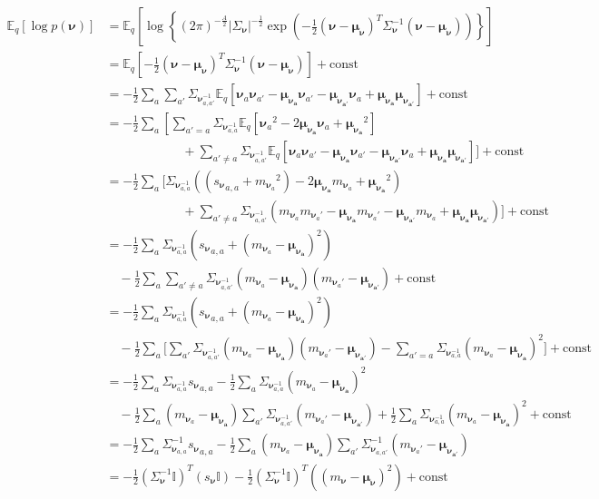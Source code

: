 \documentclass[letterpaper,12pt]{article}
\newcommand{\lc}{\left \{} %
\newcommand{\rc}{\right \}} %
\newcommand{\lp}{\left (} %
\newcommand{\rp}{\right )} %
\newcommand{\lb}{\left [} %
\newcommand{\rb}{\right ]} %
\newcommand{\mean}[1]{\ensuremath{\boldsymbol{\mu}_{#1}}} %
\newcommand{\nuv}{\boldsymbol{\nu}} %
\newcommand{\Sigmanu}{\Sigma_{\nuv}} %
\newcommand{\snu}{\ensuremath{s_\nuv}} %
\newcommand{\nua}{\ensuremath{\nuv_a}} %
\newcommand{\nuaprime}{\ensuremath{\nuv_{a'}}} %
\newcommand{\meananu}{\ensuremath{\boldsymbol{\mu_{\nuv_a}}}} %
\newcommand{\meanaprimenu}{\ensuremath{\boldsymbol{\mu_{\nuv_{a'}}}}} %
\newcommand{\mnusub}[1]{\ensuremath{m_{\nuv_#1}}} %
\newcommand{\E}{\mathbb{E}_q}
\begin{document}
\begin{equation}
\begin{split}
    \E \lb \log p(\nuv) \rb &= \E \lb \log \lc (2 \pi)^{-\frac{A}{2}}|\Sigmanu |^{-\frac{1}{2}} \exp \lp - \frac{1}{2} (\nuv - \mean{\nuv})^T \Sigmanu^{-1} (\nuv - \mean{\nuv}) \rp \rc \rb \\
    &= \E \lb - \frac{1}{2} (\nuv - \mean{\nuv})^T \Sigmanu^{-1} (\nuv - \mean{\nuv}) \rb + \textrm{const} \\
    &= - \frac{1}{2} \sum_a \sum_{a'}  \Sigmanu_{a,a'}^{-1} \E \lb \nua \nuaprime - \meananu \nuaprime - \meanaprimenu \nua + \meananu \meanaprimenu \rb + \textrm{const} \\
    &= - \frac{1}{2} \sum_a \lb \sum_{a'=a}  \Sigmanu_{a,a}^{-1} \E \lb \nua^2 - 2 \meananu \nua + \meananu^2 \rb \\
    & \qquad \qquad \qquad + \sum_{a' \neq a} \Sigmanu_{a,a'}^{-1} \E \lb  \nua \nuaprime - \meananu \nuaprime - \meanaprimenu \nua + \meananu \meanaprimenu \rb \Bigg] + \textrm{const} \\
    &= - \frac{1}{2} \sum_a \Bigg[  \Sigmanu_{a,a}^{-1} \lp \lp {\snu_{a,a}} + \mnusub{a}^2 \rp - 2 \meananu \mnusub{a} + \meananu^2 \rp \\
    & \qquad \qquad \qquad + \sum_{a' \neq a} \Sigmanu_{a,a'}^{-1} \lp \mnusub{a} \mnusub{a'} - \meananu \mnusub{a'} - \meanaprimenu \mnusub{a} + \meananu \meanaprimenu \rp \Bigg] + \textrm{const} \\
    &= - \frac{1}{2} \sum_a \Sigmanu_{a,a}^{-1} \lp {\snu_{a,a}} + \lp \mnusub{a} - \meananu \rp^2 \rp \\
    & \quad - \frac{1}{2} \sum_a \sum_{a' \neq a} \Sigmanu_{a,a'}^{-1} \lp  \mnusub{a}  - \meananu \rp \lp \mnusub{a'} - \meanaprimenu \rp  + \textrm{const} \\
    &= - \frac{1}{2} \sum_a \Sigmanu_{a,a}^{-1} \lp {\snu_{a,a}} + \lp \mnusub{a} - \meananu \rp^2 \rp \\
    & \quad - \frac{1}{2} \sum_a \bigg[ \sum_{a'} \Sigmanu_{a,a'}^{-1} \lp  \mnusub{a}  - \meananu \rp \lp \mnusub{a'} - \meanaprimenu \rp - \sum_{a'= a} \Sigmanu_{a,a}^{-1} \lp  \mnusub{a}  - \meananu \rp^2  \bigg]  + \textrm{const} \\
    &= - \frac{1}{2} \sum_a \Sigmanu_{a,a}^{-1} {\snu_{a,a}} - \frac{1}{2} \sum_a \Sigmanu_{a,a}^{-1} \lp \mnusub{a} - \meananu \rp^2 \\
    & \quad - \frac{1}{2} \sum_a \lp  \mnusub{a}  - \meananu \rp \sum_{a'} \Sigmanu_{a,a'}^{-1}  \lp \mnusub{a'} - \meanaprimenu \rp + \frac{1}{2} \sum_{a} \Sigmanu_{a,a}^{-1} \lp  \mnusub{a}  - \meananu \rp^2  + \textrm{const} \\
    & = - \frac{1}{2} \sum_a \Sigma_{\nuv_{a,a}}^{-1} {\snu_{a,a}} - \frac{1}{2} \sum_a \lp  \mnusub{a}  - \meananu \rp \sum_{a'} \Sigma_{\nuv_{a,a'}}^{-1}  \lp \mnusub{a'} - \meanaprimenu \rp \\
    &= - \frac{1}{2} (\Sigmanu^{-1} \mathbb{I} )^T (s_{\nuv} \mathbb{I}) - \frac{1}{2} (\Sigmanu^{-1} \mathbb{I} )^T \lp (m_{\nuv} - \boldsymbol{\mu}_{\nuv} )^2\rp + \textrm{const}
\end{split}
\end{equation}
\end{document}
